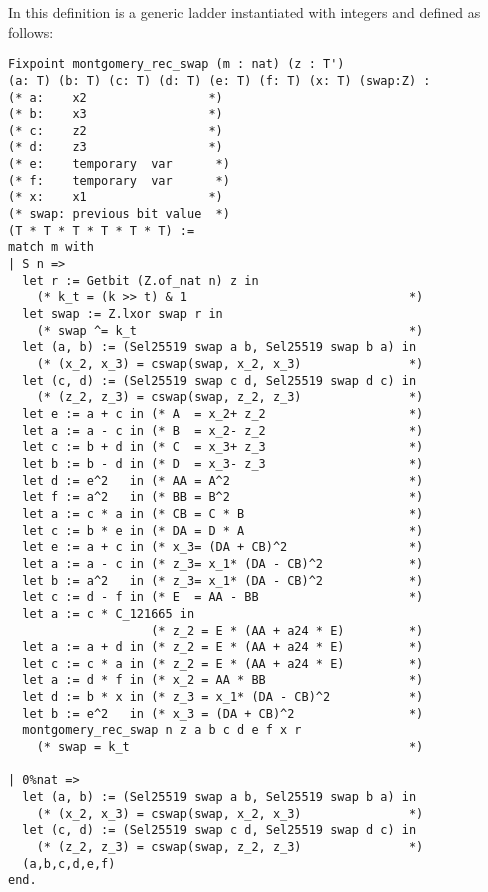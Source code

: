 In this definition  is a generic ladder instantiated
with integers and defined as follows:
\begin{lstlisting}[language=Coq]
Fixpoint montgomery_rec_swap (m : nat) (z : T')
(a: T) (b: T) (c: T) (d: T) (e: T) (f: T) (x: T) (swap:Z) :
(* a:    x2                 *)
(* b:    x3                 *)
(* c:    z2                 *)
(* d:    z3                 *)
(* e:    temporary  var      *)
(* f:    temporary  var      *)
(* x:    x1                 *)
(* swap: previous bit value  *)
(T * T * T * T * T * T) :=
match m with
| S n =>
  let r := Getbit (Z.of_nat n) z in
    (* k_t = (k >> t) & 1                               *)
  let swap := Z.lxor swap r in
    (* swap ^= k_t                                      *)
  let (a, b) := (Sel25519 swap a b, Sel25519 swap b a) in
    (* (x_2, x_3) = cswap(swap, x_2, x_3)               *)
  let (c, d) := (Sel25519 swap c d, Sel25519 swap d c) in
    (* (z_2, z_3) = cswap(swap, z_2, z_3)               *)
  let e := a + c in (* A  = x_2+ z_2                    *)
  let a := a - c in (* B  = x_2- z_2                    *)
  let c := b + d in (* C  = x_3+ z_3                    *)
  let b := b - d in (* D  = x_3- z_3                    *)
  let d := e^2   in (* AA = A^2                         *)
  let f := a^2   in (* BB = B^2                         *)
  let a := c * a in (* CB = C * B                       *)
  let c := b * e in (* DA = D * A                       *)
  let e := a + c in (* x_3= (DA + CB)^2                 *)
  let a := a - c in (* z_3= x_1* (DA - CB)^2            *)
  let b := a^2   in (* z_3= x_1* (DA - CB)^2            *)
  let c := d - f in (* E  = AA - BB                     *)
  let a := c * C_121665 in
                    (* z_2 = E * (AA + a24 * E)         *)
  let a := a + d in (* z_2 = E * (AA + a24 * E)         *)
  let c := c * a in (* z_2 = E * (AA + a24 * E)         *)
  let a := d * f in (* x_2 = AA * BB                    *)
  let d := b * x in (* z_3 = x_1* (DA - CB)^2           *)
  let b := e^2   in (* x_3 = (DA + CB)^2                *)
  montgomery_rec_swap n z a b c d e f x r
    (* swap = k_t                                       *)

| 0%nat =>
  let (a, b) := (Sel25519 swap a b, Sel25519 swap b a) in
    (* (x_2, x_3) = cswap(swap, x_2, x_3)               *)
  let (c, d) := (Sel25519 swap c d, Sel25519 swap d c) in
    (* (z_2, z_3) = cswap(swap, z_2, z_3)               *)
  (a,b,c,d,e,f)
end.
\end{lstlisting}

